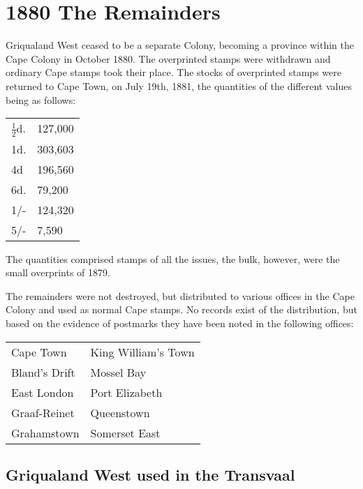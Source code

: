\chapter{1880 The Remainders} 

Griqualand West ceased to be a separate Colony, becoming a province within the Cape Colony in October 1880. The overprinted stamps were withdrawn and ordinary Cape stamps
took their place. The stocks of overprinted stamps were returned to Cape Town, on July 19th, 1881, the quantities of the different values being as follows:

\begin{tabular}{ll}$\frac{1}{2}$d.    &127,000 \\
 1d.    &303,603 \\
 4d     &196,560 \\
 6d.    &79,200  \\
 1/-    &124,320 \\
 5/-    &7,590   \\
\end{tabular}

The quantities comprised stamps of all the issues, the bulk, however, were the small overprints of 1879.

The remainders were not destroyed, but distributed to various offices in the Cape Colony and used as normal Cape stamps. No records exist of the distribution, but based on the evidence of postmarks they have been noted in the following offices:

\begin{tabular}{ll}
 Cape Town & King William's Town\\
 Bland's Drift & Mossel Bay\\
 East London & Port Elizabeth\\
 Graaf-Reinet & Queenstown\\
 Grahamstown  &Somerset East\\
\end{tabular}

\section{Griqualand West used in the Transvaal}


